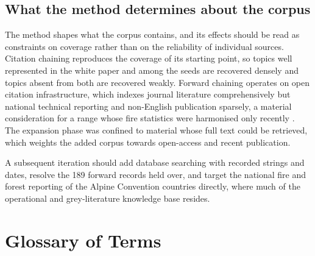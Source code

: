 \documentclass[11pt,a4paper]{article}
\begin{document}
\subsection{What the method determines about the corpus}

The method shapes what the corpus contains, and its effects should be read as constraints on coverage rather than on the reliability of individual sources. Citation chaining reproduces the coverage of its starting point, so topics well represented in the white paper and among the seeds are recovered densely and topics absent from both are recovered weakly. Forward chaining operates on open citation infrastructure, which indexes journal literature comprehensively but national technical reporting and non-English publication sparsely, a material consideration for a range whose fire statistics were harmonised only recently \citep{valese_wildfires_2011, muller_forest_2020}. The expansion phase was confined to material whose full text could be retrieved, which weights the added corpus towards open-access and recent publication.

A subsequent iteration should add database searching with recorded strings and dates, resolve the 189 forward records held over, and target the national fire and forest reporting of the Alpine Convention countries directly, where much of the operational and grey-literature knowledge base resides.

\section{Glossary of Terms}
\end{document}
